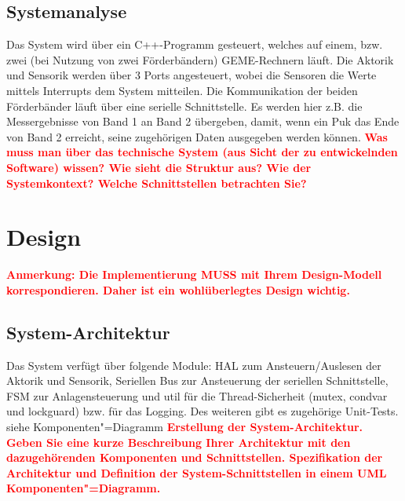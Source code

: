 \documentclass[oneside,a4paper,titlepage]{scrartcl} %
\begin{document}
\newpage

\subsection{Systemanalyse}
Das System wird über ein C++-Programm gesteuert, welches auf einem, bzw. zwei (bei Nutzung von zwei Förderbändern) GEME-Rechnern läuft. Die Aktorik und Sensorik werden über 3 Ports angesteuert, wobei die Sensoren die Werte mittels Interrupts dem System mitteilen.\newline
Die Kommunikation der beiden Förderbänder läuft über eine serielle Schnittstelle. Es werden hier z.B. die Messergebnisse von Band 1 an Band 2 übergeben, damit, wenn ein Puk das Ende von Band 2 erreicht, seine zugehörigen Daten ausgegeben werden können.\newline
\newline
\textcolor{red}{\textbf{Was muss man über das technische System (aus Sicht der zu entwickelnden Software) wissen?
Wie sieht die Struktur aus? Wie der Systemkontext? Welche Schnittstellen betrachten Sie?}}

\newpage

\section{Design}
\textcolor{red}{\textbf{Anmerkung: Die Implementierung MUSS mit Ihrem Design-Modell korrespondieren.
Daher ist ein wohlüberlegtes Design wichtig.}}

\subsection{System-Architektur}
Das System verfügt über folgende Module: HAL zum Ansteuern/Auslesen der Aktorik und Sensorik, Seriellen Bus zur Ansteuerung der seriellen Schnittstelle, FSM zur Anlagensteuerung und util für die Thread-Sicherheit (mutex, condvar und lockguard) bzw. für das Logging. Des weiteren gibt es zugehörige Unit-Tests.\newline
siehe Komponenten"=Diagramm\newline
\textcolor{red}{\textbf{Erstellung der System-Architektur. Geben Sie eine kurze Beschreibung Ihrer
Architektur mit den dazugehörenden Komponenten und Schnittstellen.
Spezifikation der Architektur und Definition der System-Schnittstellen in einem UML Komponenten"=Diagramm.}}
\end{document}
